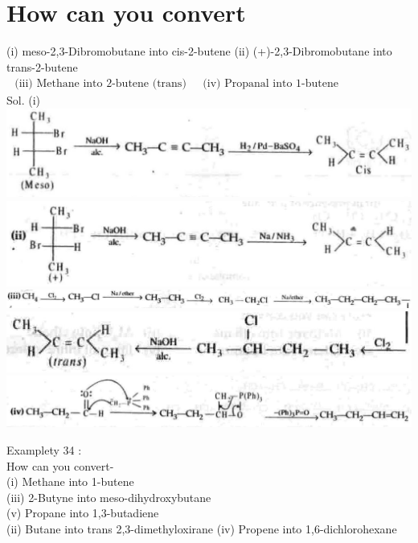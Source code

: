\documentclass[10pt]{article}
\begin{document}
\section*{How can you convert}
(i) meso-2,3-Dibromobutane into cis-2-butene (ii) (+)-2,3-Dibromobutane into trans-2-butene\\
$\begin{array}{ll}\text { (iii) Methane into 2-butene (trans) } & \text { (iv) Propanal into 1-butene }\end{array}$\\
Sol. (i)\\
\includegraphics[max width=\textwidth, center]{2025_01_28_8470952b98110cec3aabg-226(3)}\\
\includegraphics[max width=\textwidth, center]{2025_01_28_8470952b98110cec3aabg-226(7)}\\
\includegraphics[max width=\textwidth, center]{2025_01_28_8470952b98110cec3aabg-226}\\
\includegraphics[max width=\textwidth, center]{2025_01_28_8470952b98110cec3aabg-226(5)}\\
\includegraphics[max width=\textwidth, center]{2025_01_28_8470952b98110cec3aabg-226(4)}

Examplety 34 :\\
How can you convert-\\
(i) Methane into 1-butene\\
(iii) 2-Butyne into meso-dihydroxybutane\\
(v) Propane into 1,3-butadiene\\
(ii) Butane into trans 2,3-dimethyloxirane (iv) Propene into 1,6-dichlorohexane
\end{document}
